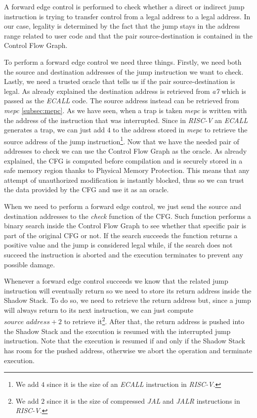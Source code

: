 A forward edge control is performed to check whether a direct or indirect jump
instruction is trying to transfer control from a legal address to a legal
address. In our case, legality is determined by the fact that the jump stays in
the address range related to user code and that the pair source-destination is
contained in the Control Flow Graph.

To perform a forward edge control we need three things. Firstly, we need both
the source and destination addresses of the jump instruction we want to check. Lastly,
we need a trusted oracle that tells us if the pair source-destination is legal. As
already explained the destination address is retrieved from \textit{a7} which is
passed as the \textit{ECALL} code. The source address instead can be retrieved
from \textit{mepc} \ref{subsec:mepc}. As we have seen, when a trap is taken \textit{mepc}
is written with the address of the instruction that was interrupted. Since in \textit{RISC-V}
an \textit{ECALL} generates a trap, we can just add $4$ to the address stored in
\textit{mepc} to retrieve the source address of the jump instruction\footnote{We
add $4$ since it is the size of an \textit{ECALL} instruction in \textit{RISC-V}.}.
Now that we have the needed pair of addresses to check we can use the Control Flow
Graph as the oracle. As already explained, the CFG is computed before compilation
and is securely stored in a safe memory region thanks to Physical Memory Protection.
This means that any attempt of unauthorized modification is instantly blocked, thus
so we can trust the data provided by the CFG and use it as an oracle.

When we need to perform a forward edge control, we just send the source and
destination addresses to the \textit{check} function of the CFG. Such function
performs a binary search inside the Control Flow Graph to see whether that
specific pair is part of the original CFG or not. If the search succeeds the function
returns a positive value and the jump is considered legal while, if the search
does not succeed the instruction is aborted and the execution terminates to
prevent any possible damage.

Whenever a forward edge control succeeds we know that the related jump
instruction will eventually return so we need to store its return address inside
the Shadow Stack. To do so, we need to retrieve the return address but, since a jump
will always return to its next instruction, we can just compute
$\textit{source address}+ 2$ to retrieve it\footnote{We add $2$ since it is the
size of compressed \textit{JAL} and \textit{JALR} instructions in \textit{RISC-V}.}.
After that, the return address is pushed into the Shadow Stack and the execution
is resumed with the interrupted jump instruction. Note that the execution is
resumed if and only if the Shadow Stack has room for the pushed address, otherwise
we abort the operation and terminate execution.

